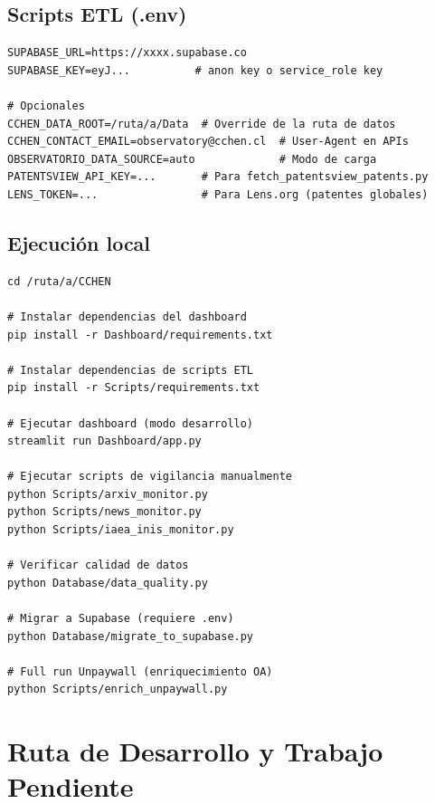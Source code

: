 \documentclass[12pt,a4paper]{report}
\begin{document}
\section{Scripts ETL (.env)}

\begin{lstlisting}[style=bashstyle, caption={Variables de entorno para ETL}]
SUPABASE_URL=https://xxxx.supabase.co
SUPABASE_KEY=eyJ...          # anon key o service_role key

# Opcionales
CCHEN_DATA_ROOT=/ruta/a/Data  # Override de la ruta de datos
CCHEN_CONTACT_EMAIL=observatory@cchen.cl  # User-Agent en APIs
OBSERVATORIO_DATA_SOURCE=auto             # Modo de carga
PATENTSVIEW_API_KEY=...       # Para fetch_patentsview_patents.py
LENS_TOKEN=...                # Para Lens.org (patentes globales)
\end{lstlisting}

\section{Ejecución local}

\begin{lstlisting}[style=bashstyle, caption={Comandos de instalación y ejecución}]
cd /ruta/a/CCHEN

# Instalar dependencias del dashboard
pip install -r Dashboard/requirements.txt

# Instalar dependencias de scripts ETL
pip install -r Scripts/requirements.txt

# Ejecutar dashboard (modo desarrollo)
streamlit run Dashboard/app.py

# Ejecutar scripts de vigilancia manualmente
python Scripts/arxiv_monitor.py
python Scripts/news_monitor.py
python Scripts/iaea_inis_monitor.py

# Verificar calidad de datos
python Database/data_quality.py

# Migrar a Supabase (requiere .env)
python Database/migrate_to_supabase.py

# Full run Unpaywall (enriquecimiento OA)
python Scripts/enrich_unpaywall.py
\end{lstlisting}

\chapter{Ruta de Desarrollo y Trabajo Pendiente}
\end{document}
